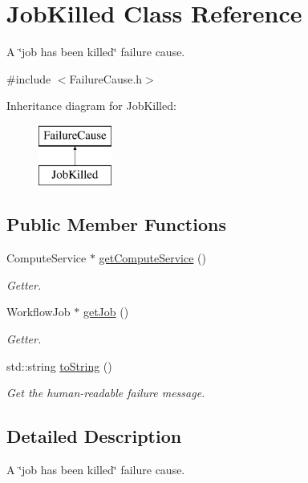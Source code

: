 \hypertarget{class_job_killed}{}\section{Job\+Killed Class Reference}
\label{class_job_killed}


A \char`\"{}job has been killed\char`\"{} failure cause.  




{\ttfamily \#include $<$Failure\+Cause.\+h$>$}

Inheritance diagram for Job\+Killed\+:\begin{figure}[H]
\begin{center}
\leavevmode
\includegraphics[height=2.000000cm]{class_job_killed}
\end{center}
\end{figure}
\subsection*{Public Member Functions}
\begin{DoxyCompactItemize}
\item 
Compute\+Service $\ast$ \hyperlink{class_job_killed_ac0ffaa931ac5ad96fc312b96cdc0adf3}{get\+Compute\+Service} ()
\begin{DoxyCompactList}\small\item\em Getter. \end{DoxyCompactList}\item 
Workflow\+Job $\ast$ \hyperlink{class_job_killed_a209244f2fcf845c2b5add291d74b83cf}{get\+Job} ()
\begin{DoxyCompactList}\small\item\em Getter. \end{DoxyCompactList}\item 
std\+::string \hyperlink{class_job_killed_a26c9c5f201637b2b0f39fee61426da77}{to\+String} ()
\begin{DoxyCompactList}\small\item\em Get the human-\/readable failure message. \end{DoxyCompactList}\end{DoxyCompactItemize}


\subsection{Detailed Description}
A \char`\"{}job has been killed\char`\"{} failure cause. 

